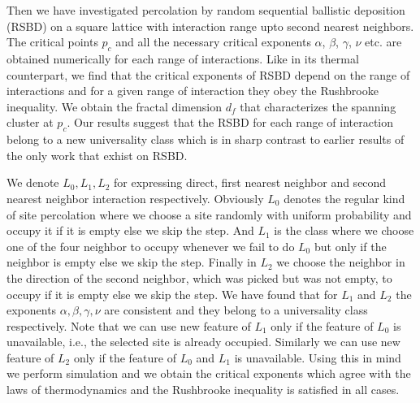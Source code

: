  Then we have investigated percolation by random sequential ballistic deposition (RSBD) on a square lattice with interaction range upto second nearest neighbors. The critical points $p_c$ and all the necessary critical exponents $\alpha$, $\beta$, $\gamma$, $\nu$ etc. are obtained numerically for each range of interactions. Like  in its thermal counterpart, we find that the critical exponents of RSBD depend on the range of interactions and for a given range of interaction they obey the Rushbrooke inequality. We obtain  the fractal dimension $d_f$ that characterizes the spanning cluster at $p_c$. Our results suggest that the RSBD for each range of interaction belong to a new universality class which is in sharp contrast to earlier results of the only work that exhist on RSBD.
 

We denote $L_0,L_1,L_2$ for expressing direct, first nearest neighbor and second nearest neighbor interaction respectively. Obviously $L_0$ denotes the regular kind of site percolation where we choose a site randomly with uniform probability and occupy it if it is empty else we skip the step. And $L_1$ is the class where we choose one of the four neighbor to occupy whenever we fail to do $L_0$ but only if the neighbor is empty else we skip the step. Finally in $L_2$ we choose the neighbor in the direction of the second neighbor, which was picked but was not empty, to occupy if it is empty else we skip the step. We have found that for $L_1$ and $L_2$ the exponents $\alpha, \beta, \gamma, \nu$ are consistent and they belong to a universality class respectively. 
Note that  we can use new feature of $L_1$ only if the feature of $L_0$ is unavailable, i.e., the selected site is already occupied. Similarly we can use new feature of $L_2$ only if the feature of $L_0$ and $L_1$ is unavailable. Using this in mind we perform simulation and we obtain the critical exponents which agree with the laws of thermodynamics and the Rushbrooke inequality is satisfied in all cases.

\clearpage
\newpage
